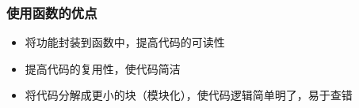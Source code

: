 \begin{frame}[fragile]
    \frametitle{使用函数的优点}

        \begin{itemize}
            \item 将功能封装到函数中，提高代码的可读性
            \item 提高代码的复用性，使代码简洁
            \item 将代码分解成更小的块（模块化），使代码逻辑简单明了，易于查错
        \end{itemize}
    
\end{frame}




